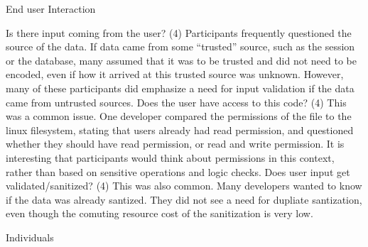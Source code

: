 \documentclass[twoside,letterpaper]{soups}
\begin{document}
End user Interaction

Is there input coming from the user? (4) Participants frequently questioned the source of the data. If data came from some “trusted” source, such as the session or the database,  many assumed that it was to be trusted and did not need to be encoded, even if how it arrived at this trusted source was unknown. However, many of these participants did emphasize a need for input validation if the data came from untrusted sources.
Does the user have access to this code? (4) This was a common issue. One developer compared the permissions of the file to the linux filesystem, stating that users already had read permission, and questioned whether they should have read permission, or read and write permission. It is interesting that participants would think about permissions in this context, rather than based on sensitive operations and logic checks.
Does user input get validated/sanitized? (4) This was also common. Many developers wanted to know if the data was already santized. They did not see a need for dupliate santization, even though the comuting resource cost of the sanitization is very low.

Individuals
\end{document}
